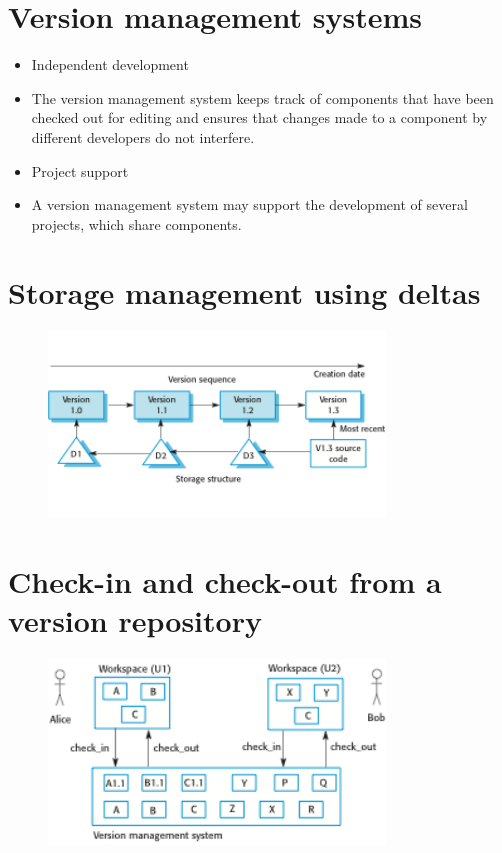 \section{Version management systems}
\begin{itemize}

\item Independent development

   \item The version management system keeps track of components that have been checked out for editing and ensures that changes made to a component by different developers do not interfere.

\item Project support

   \item A version management system may support the development of several projects, which share components.


\end{itemize}
\section{Storage management using deltas}
\begin{figure}[h!]
    \centering
    \includegraphics[width = 0.8\textwidth]{./figures/L8_4.png}
    \caption{}
    \label{fig:L8_4}
\end{figure}

\section{Check-in and check-out from a version repository}
\begin{figure}[h!]
    \centering
    \includegraphics[width = 0.8\textwidth]{./figures/L8_5.png}
    \caption{}
    \label{fig:L8_5}
\end{figure}


